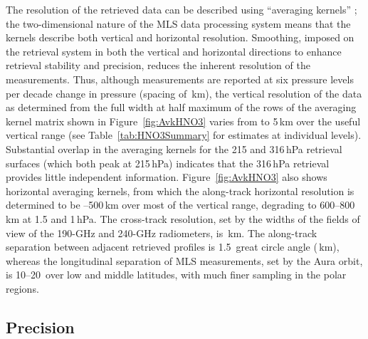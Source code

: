 The resolution of the retrieved data can be described using ``averaging kernels'' \citep[e.g.,][]{Rodgers:2000}; the two-dimensional nature of the MLS data processing system means that the kernels describe both vertical and horizontal resolution. Smoothing, imposed on the retrieval system in both the vertical and horizontal directions to enhance retrieval stability and precision, reduces the inherent resolution of the measurements. Thus, although  measurements are reported at six pressure levels per decade change in pressure (spacing of \,km), the vertical resolution of the \thisv {} data as determined from the full width at half maximum of the rows of the averaging kernel matrix shown in Figure~\ref{fig:AvkHNO3} varies from  to 5\,km over the useful vertical range (see Table~\ref{tab:HNO3Summary} for estimates at individual levels). Substantial overlap in the averaging kernels for the 215 and 316\,hPa retrieval surfaces (which both peak at 215\,hPa) indicates that the 316\,hPa retrieval provides little independent information. Figure~\ref{fig:AvkHNO3} also shows horizontal averaging kernels, from which the along-track horizontal resolution is determined to be --500\,km over most of the vertical range, degrading to 600--800\,km at 1.5 and 1\,hPa. The cross-track resolution, set by the widths of the fields of view of the \mbox{190\nobreakdash-GHz} and \mbox{240\nobreakdash-GHz} radiometers, is \,km. The along-track separation between adjacent retrieved profiles is 1.5\degsym\ great circle angle (\,km), whereas the longitudinal separation of MLS measurements, set by the Aura orbit, is 10\degsym--20\degsym\ over low and middle latitudes, with much finer sampling in the polar regions.

\subsection{Precision}

